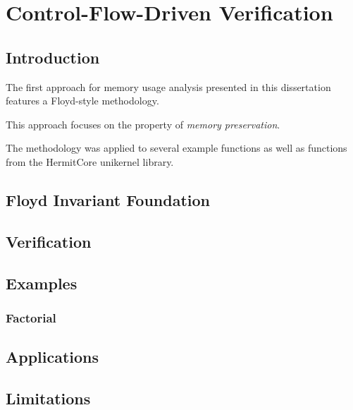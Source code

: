 \chapter{Control-Flow-Driven Verification}

\section{Introduction}\label{se:cfg_intro}
The first approach for memory usage analysis presented in this dissertation
features a Floyd-style methodology.

This approach focuses on the property of \emph{memory preservation}.

The methodology was applied to several example functions
as well as functions from the HermitCore unikernel library.

\section{Floyd Invariant Foundation}\label{se:cfg_invariant}

\section{Verification}\label{se:cfg_verification}

\section{Examples}\label{se:cfg_examples}
\subsection{Factorial}

\section{Applications}

\section{Limitations}

